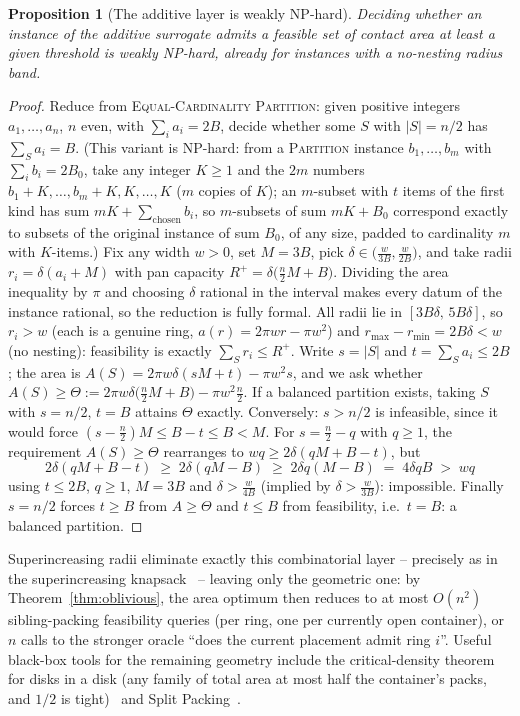 \documentclass[11pt]{article}
\newtheorem{proposition}[theorem]{Proposition}
\theoremstyle{definition}
\begin{document}
\begin{proposition}[The additive layer is weakly NP-hard]
\label{prop:additivehard}
Deciding whether an instance of the additive surrogate admits a feasible
set of contact area at least a given threshold is weakly NP-hard, already
for instances with a no-nesting radius band.
\end{proposition}
\begin{proof}
Reduce from \textsc{Equal-Cardinality Partition}: given positive integers
$a_1,\dots,a_n$, $n$ even, with $\sum_i a_i=2B$, decide whether some $S$
with $|S|=n/2$ has $\sum_{S}a_i=B$. (This variant is NP-hard: from a
\textsc{Partition} instance $b_1,\dots,b_m$ with $\sum_i b_i=2B_0$, take
any integer $K\ge1$ and the $2m$ numbers $b_1+K,\dots,b_m+K,K,\dots,K$ ($m$
copies of $K$); an $m$-subset with $t$ items of the first kind has sum
$mK+\sum_{\mathrm{chosen}}b_i$, so $m$-subsets of sum $mK+B_0$ correspond
exactly to subsets of the original instance of sum $B_0$, of any size,
padded to cardinality $m$ with $K$-items.) Fix any width $w>0$, set $M=3B$, pick
$\delta\in\bigl(\tfrac{w}{3B},\tfrac{w}{2B}\bigr)$, and take radii
$r_i=\delta(a_i+M)$ with pan capacity $R^{+}=\delta\bigl(\tfrac n2M+B\bigr)$.
Dividing the area inequality by $\pi$ and choosing $\delta$ rational
in the interval makes every datum of the instance rational, so the
reduction is fully formal.
All radii lie in $[3B\delta,\,5B\delta]$, so $r_i>w$ (each is a genuine
ring, $a(r)=2\pi wr-\pi w^2$) and $r_{\max}-r_{\min}=2B\delta<w$ (no
nesting): feasibility is exactly $\sum_S r_i\le R^{+}$. Write $s=|S|$ and
$t=\sum_S a_i\le 2B$; the area is
$A(S)=2\pi w\delta(sM+t)-\pi w^2 s$, and we ask whether
$A(S)\ge\Theta:=2\pi w\delta\bigl(\tfrac n2M+B\bigr)-\pi w^2\tfrac n2$.
If a balanced partition exists, taking $S$ with $s=n/2$, $t=B$ attains
$\Theta$ exactly. Conversely: $s>n/2$ is infeasible, since it would force
$(s-\tfrac n2)M\le B-t\le B<M$. For $s=\tfrac n2-q$ with $q\ge1$, the
requirement $A(S)\ge\Theta$ rearranges to $wq\ge2\delta(qM+B-t)$, but
\[
2\delta(qM+B-t)\;\ge\;2\delta(qM-B)\;\ge\;2\delta q(M-B)\;=\;4\delta qB
\;>\;wq
\]
using $t\le2B$, $q\ge1$, $M=3B$ and $\delta>\tfrac{w}{4B}$ (implied by
$\delta>\tfrac{w}{3B}$): impossible. Finally $s=n/2$ forces $t\ge B$ from
$A\ge\Theta$ and $t\le B$ from feasibility, i.e.\ $t=B$: a balanced
partition.
\end{proof}

Superincreasing radii eliminate exactly this combinatorial layer --
precisely as in the superincreasing knapsack~\cite{Gupte2016} -- leaving
only the geometric one: by Theorem~\ref{thm:oblivious}, the area optimum
then reduces to at most $O(n^2)$ sibling-packing feasibility queries (per
ring, one per currently open container), or $n$ calls to the stronger
oracle ``does the current placement admit ring $i$''. Useful
black-box tools for the remaining geometry include the critical-density theorem
for disks in a disk (any family of total area at most half the container's
packs, and $1/2$ is tight)~\cite{FeketeKeldenichScheffer2019} and Split
Packing~\cite{FeketeMorrScheffer2019}.
\end{document}

